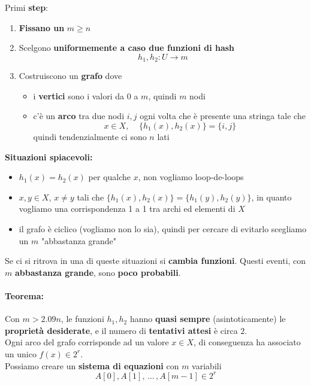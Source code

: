 Primi \textbf{step}:
\begin{enumerate}
	\item \textbf{Fissano un} $m \geq n$
	\item Scelgono \textbf{uniformemente a caso due funzioni di hash }
	$$ h_1, h_2: U \rightarrow m $$
	\item Costruiscono un \textbf{grafo} dove
	\begin{itemize}
		\item i \textbf{vertici} sono i valori da $0$ a $m$, quindi $m$ nodi
		\item c'è un \textbf{arco} tra due nodi $i,j$ ogni volta che è presente una stringa tale che 
		$$x \in X, \;\;\;\; \{h_1(x), h_2(x)\} = \{i,j\} $$
		quindi tendenzialmente ci sono $n$ lati
	\end{itemize}
\end{enumerate}

\textbf{Situazioni spiacevoli:} 
\begin{itemize}
	\item $h_1(x) = h_2 (x)$ per qualche $x$, non vogliamo loop-de-loops
	\item $x,y \in X$, $x \neq y$ tali che $\{h_1 (x), h_2 (x)\} = \{h_1 (y), h_2 (y)\}$, in quanto vogliamo una corrispondenza 1 a 1 tra archi ed elementi di $X$
	\item il grafo è ciclico (vogliamo non lo sia), quindi per cercare di evitarlo scegliamo un $m$ "abbastanza grande"
\end{itemize}
Se ci si ritrova in una di queste situazioni si \textbf{cambia funzioni}. Questi eventi, con $m$ \textbf{abbastanza grande}, sono \textbf{poco probabili}.

\newpage

\paragraph{Teorema:} Con $m > 2.09n$, le funzioni $h_1, h_2$ hanno \textbf{quasi sempre} (asintoticamente) le \textbf{proprietà desiderate}, e il numero di \textbf{tentativi attesi} è circa $2$.\\

Ogni arco del grafo corrisponde ad un valore $x \in X$, di conseguenza ha associato un unico $f(x) \in 2^r$.\\

Possiamo creare un \textbf{sistema di equazioni} con $m$ variabili
$$ A[0], A[1], \, \dots \, , A[m-1] \in 2^r $$

